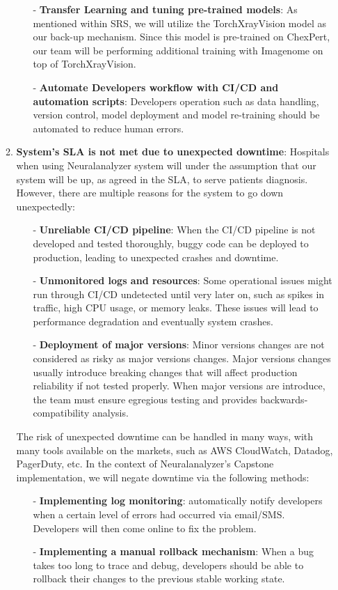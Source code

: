 \documentclass{article}
\begin{document}
\begin{enumerate}
\begin{enumerate}
\begin{itemize}
            \item[-] \textbf{Transfer Learning and tuning pre-trained models}: As mentioned within SRS, we will utilize the TorchXrayVision model as our back-up mechanism. Since this model is pre-trained on ChexPert, our team will be performing additional training with Imagenome on top of TorchXrayVision.
            \item[-] \textbf{Automate Developers workflow with CI/CD and automation scripts}: Developers operation such as data handling, version control, model deployment and model re-training should be automated to reduce human errors.
        \end{itemize}
        
        
        \item \textbf{System's SLA is not met due to unexpected downtime}: Hospitals when using Neuralanalyzer system will under the assumption that our system will be up, as agreed in the SLA, to serve patients diagnosis. However, there are multiple reasons for the system to go down unexpectedly:
        \begin{itemize}
            \item[-] \textbf{Unreliable CI/CD pipeline}: When the CI/CD pipeline is not developed and tested thoroughly, buggy code can be deployed to production, leading to unexpected crashes and downtime.
            \item[-] \textbf{Unmonitored logs and resources}: Some operational issues might run through CI/CD undetected until very later on, such as spikes in traffic, high CPU usage, or memory leaks. These issues will lead to performance degradation and eventually system crashes.
            \item[-] \textbf{Deployment of major versions}: Minor versions changes are not considered as risky as major versions changes. Major versions changes usually introduce breaking changes that will affect production reliability if not tested properly. When major versions are introduce, the team must ensure egregious testing and provides backwards-compatibility analysis.
        \end{itemize}
        The risk of unexpected downtime can be handled in many ways, with many tools available on the markets, such as AWS CloudWatch, Datadog, PagerDuty, etc. In the context of Neuralanalyzer's Capstone implementation, we will negate downtime via the following methods:
        \begin{itemize}
            \item[-] \textbf{Implementing log monitoring}: automatically notify developers when a certain level of errors had occurred via email/SMS. Developers will then come online to fix the problem.
            \item[-] \textbf{Implementing a manual rollback mechanism}: When a bug takes too long to trace and debug, developers should be able to rollback their changes to the previous stable working state.
        \end{itemize}
    \end{enumerate}

\end{enumerate}
\end{document}

